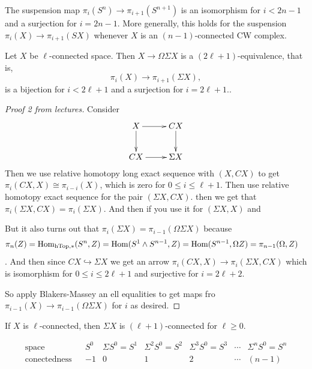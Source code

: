 \begin{lemma}
\label{lemma-freud-suspe-theor-hatch-4}
	The suspension map $\pi_{i}(S^{n})\to
	\pi_{i+1}(S^{n+1})$ is an isomorphism for
	$i<2n-1$ and a surjection for $i=2n-1$. More
	generally, this holds for the suspension
	$\pi_{i}(X)\to \pi_{i+1}(SX)$ whenever $X$
	is an $(n-1)$-connected CW complex.
\end{lemma}
\begin{theorem}
\label{theorem-freud-suspe-theor-lectu}
		Let $X$ be $\ell$-connected space. Then
		$X\to\Omega\Sigma X$ is a
		$(2\ell+1)$-equivalence, that is,
	$$\pi_i(X)\to \pi_{i+1}(\Sigma X),$$
	is a bijection for $i<2\ell+1$ and a
	surjection for $i=2\ell+1$..
\end{theorem}
\begin{proof}[Proof 2 from lectures]
	Consider
	$$
	\xymatrix{
		X\ar[r]\ar[d]&CX\ar[d]\\
		CX\ar[r]&\Sigma X
	}
	$$
	Then we use relative homotopy long exact
	sequence with $(X,CX)$ to get
	$\pi_i(CX,X)\cong\pi_{i-i}(X)$, which is
	zero for $0\leq i\leq \ell+1$. Then use
	relative homotopy exact sequence for the
	pair $(\Sigma X,CX)$. then we get that
	$\pi_i(\Sigma X,CX)=\pi_i(\Sigma X)$. And
	then if you use it for $(\Sigma X, X)$ and

	But it also turns out that $\pi_i(\Sigma
	X)=\pi_{i-1}(\Omega\Sigma X)$ because
	$$
\begin{aligned}
		\pi_n(Z)&=\mathop{\mathrm{Hom}}\nolimits_{\text{hTop},*}(S^n,Z)=
		\mathop{\mathrm{Hom}}\nolimits(S^1\wedge
		S^{n-1},Z)=\text{Hom}(S^{n-1},\Omega
		Z)=\pi_{n-1}(\Omega,Z)
	\end{aligned}
$$.
	And then since $CX\hookrightarrow \Sigma X$
	we get an arrow $\pi_i(CX,X)\to\pi_i(\Sigma
	X,CX)$ which is isomorphism for $0\leq i
	\leq 2\ell +1$ and surjective for
	$i=2\ell+2$.

	So apply Blakers-Massey an ell equalities to
	get maps fro
	$\pi_{i-1}(X)\to\pi_{i-1}(\Omega\Sigma X)$
	for $i$ as desired.
\end{proof}
\begin{lemma}
\label{lemma-if-x-conne-then-x-1-conne}
	If $X$ is $\ell$-connected, then $\Sigma X$
	is $(\ell+1)$-connected for $\ell\geq0$.
\end{lemma}
$$\begin{matrix}
	\text{space}&&S^0&\Sigma
	S^0=S^1&\Sigma^2S^0=S^2&\Sigma^3S^0=S^3&
	\cdots&\Sigma^nS^0=S^n\\
	\text{conectedness}&&-1&0&1&2&\cdots&(n-1)
\end{matrix}$$

